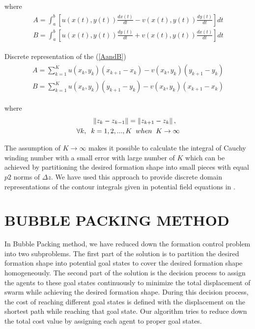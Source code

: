 \documentclass[letterpaper, 10 pt, conference]{ieeeconf}  %
\newcommand{\norm}[1]{\left\lVert#1\right\rVert}
\begin{document}
where
\begin{align} \label{AandB}
\begin{split}
A = \int_{a}^{b}\left[u(x(t),y(t) )\frac{dx(t)}{dt} - v(x(t),y(t) )\frac{dy(t)}{dt}\right]dt \\
B = \int_{a}^{b} \left[u(x(t),y(t) )\frac{dy(t)}{dt} + v(x(t),y(t) )\frac{dx(t)}{dt}\right]dt
\end{split}
\end{align}

Discrete representation of the (\ref{AandB})
\begin{align} \label{AandB_discrete}
\begin{split}
A = \sum_{k=1}^{K} {u(x_k, y_k)(x_{k+1} - x_k) - v(x_k, y_k)(y_{k+1} - y_k) }\\
B = \sum_{k=1}^{K} {u(x_k, y_k)(y_{k+1} - y_k) - v(x_k, y_k)(x_{k+1} - x_k) }
\end{split}
\end{align}

where
\begin{equation}
\begin{split}
\norm{z_k - z_{k-1}} = \norm{z_{k+1} - z_k}, \hspace{0.2cm}\\ 
 \forall k,   \hspace{0.2cm} k=1,2,...,K \hspace{0.2cm} when  \hspace{0.2cm} K \to\infty
\end{split}
\end{equation}

The assumption of $K \to\infty$ makes it possible to calculate the integral of Cauchy winding number with a small error with large number of $K$ which can be achieved by partitioning the desired formation shape  into small pieces with equal $p2$ norms of $\Delta z$. We have used this approach to provide discrete domain representations of the contour integrals given in potential field equations in \cite{17}.

\section{BUBBLE PACKING METHOD}
In Bubble Packing method, we have reduced down the formation control problem into two subproblems. The first part of the solution is to partition the desired formation shape into potential goal states to cover the desired formation shape homogeneously. The second part of the solution is the decision process to assign the agents to these goal states continuously to minimize the total displacement of swarm while achieving the desired formation shape. During this decision process, the cost of reaching different goal states is defined with the displacement on the shortest path while reaching that goal state. Our algorithm tries to reduce down the total cost value by assigning each agent to proper goal states.
			
\end{document}
